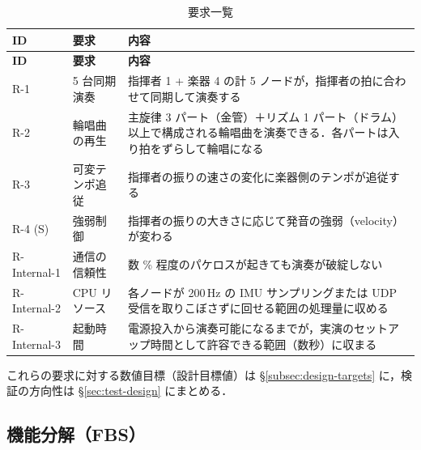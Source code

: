 \documentclass[lualatex,book,paper=a4paper,jafontsize=11.5pt,jafontscale=1.05]{jlreq}
\begin{document}
\begin{longtable}{L{0.13\textwidth} L{0.27\textwidth} L{0.48\textwidth}}
\caption{要求一覧}\label{tab:requirements}\\
\toprule
\textbf{ID} & \textbf{要求} & \textbf{内容} \\
\midrule
\endfirsthead
\toprule
\textbf{ID} & \textbf{要求} & \textbf{内容} \\
\midrule
\endhead
R-1          & 5 台同期演奏   & 指揮者 1 + 楽器 4 の計 5 ノードが，指揮者の拍に合わせて同期して演奏する \\
R-2          & 輪唱曲の再生   & 主旋律 3 パート（金管）＋リズム 1 パート（ドラム）以上で構成される輪唱曲を演奏できる．各パートは入り拍をずらして輪唱になる \\
R-3          & 可変テンポ追従 & 指揮者の振りの速さの変化に楽器側のテンポが追従する \\
R-4 (S)      & 強弱制御       & 指揮者の振りの大きさに応じて発音の強弱（velocity）が変わる \\
R-Internal-1 & 通信の信頼性   & 数 \% 程度のパケロスが起きても演奏が破綻しない \\
R-Internal-2 & CPU リソース   & 各ノードが 200\,Hz の IMU サンプリングまたは UDP 受信を取りこぼさずに回せる範囲の処理量に収める \\
R-Internal-3 & 起動時間       & 電源投入から演奏可能になるまでが，実演のセットアップ時間として許容できる範囲（数秒）に収まる \\
\bottomrule
\end{longtable}

これらの要求に対する数値目標（設計目標値）は \S\ref{subsec:design-targets} に，検証の方向性は
\S\ref{sec:test-design} にまとめる．

\subsection{機能分解（FBS）}
\end{document}
